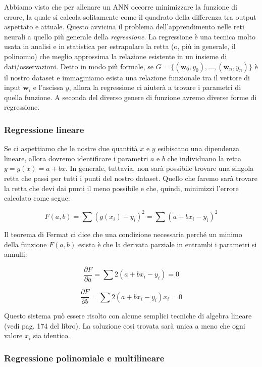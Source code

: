 \documentclass[10pt,a4paper]{article}
\newcommand{\ww}{\mathbf{w}}
\begin{document}
Abbiamo visto che per allenare un ANN occorre minimizzare la funzione di errore, la quale si calcola solitamente come il quadrato della differenza tra output aspettato e attuale. Questo avvicina il problema dell'apprendimento nelle reti neurali a quello più generale della \emph{regressione}. La regressione è una tecnica molto usata in analisi e in statistica per estrapolare la retta (o, più in generale, il polinomio) che meglio approssima la relazione esistente in un insieme di dati/osservazioni. Detto in modo più formale, se $G = \{(\ww_0,y_0), \dots, (\ww_n,y_n)\}$ è il nostro dataset e immaginiamo esista una relazione funzionale tra il vettore di input $\ww_i$ e l'ascissa $y$, allora la regressione ci aiuterà a trovare i parametri di quella funzione. A seconda del diverso genere di funzione avremo diverse forme di regressione.

\subsubsection{Regressione lineare}

Se ci aspettiamo che le nostre due quantità $x$ e $y$ esibiscano una dipendenza lineare, allora dovremo identificare i parametri $a$ e $b$ che individuano la retta $y = g(x) = a + bx$. In generale, tuttavia, non sarà possibile trovare una singola retta che passi per tutti i punti del nostro dataset. Quello che faremo sarà trovare la retta che devi dai punti il meno possibile e che, quindi, minimizzi l'errore calcolato come segue: 

$$
F(a,b) = \sum(g(x_i) - y_i)^2 = \sum(a + bx_i - y_i)^2
$$

Il teorema di Fermat ci dice che una condizione necessaria perché un minimo della funzione $F(a,b)$ esista è che la derivata parziale in entrambi i parametri si annulli:

$$
\frac{\partial F}{\partial a} = \sum 2(a + bx_i - y_i) = 0
$$

$$
\frac{\partial F}{\partial b} = \sum 2(a + bx_i - y_i)x_i = 0
$$

Questo sistema può essere risolto con alcune semplici tecniche di algebra lineare (vedi pag. 174 del libro). La soluzione così trovata sarà unica a meno che ogni valore $x_i$ sia identico. 

\subsubsection{Regressione polinomiale e multilineare}
\end{document}
